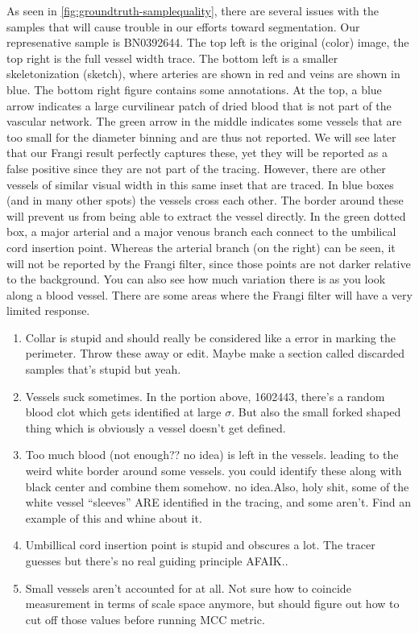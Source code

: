 As seen in \cref{fig:groundtruth-samplequality}, there are several issues with the samples that will cause trouble in our efforts toward segmentation. Our represenative sample is BN0392644. The top left is the original (color) image, the top right is the full vessel width trace. The bottom left is a smaller skeletonization (sketch), where arteries are shown in red and veins are shown in blue. The bottom right figure contains some annotations. At the top, a blue arrow indicates a large curvilinear patch of dried blood that is not part of the vascular network. The green arrow in the middle indicates some vessels that are too small for the diameter binning and are thus not reported. We will see later that our Frangi result perfectly captures these, yet they will be reported as a false positive since they are not part of the tracing. However, there are other vessels of similar visual width in this same inset that are traced. In blue boxes (and in many other spots) the vessels cross each other. The border around these will prevent us from being able to extract the vessel directly. In the green dotted box, a major arterial and a major venous branch each connect to the umbilical cord insertion point. Whereas the arterial branch (on the right) can be seen, it will not be reported by the Frangi filter, since those points are not darker relative to the background. You can also see how much variation there is as you look along a blood vessel. There are some areas where the Frangi filter will have a very limited response. 



\begin{enumerate}
\item Collar is stupid and should really be considered like a error in marking the perimeter. Throw these away or edit. Maybe make a section called discarded samples that's stupid but yeah.
\item Vessels suck sometimes. In the portion above, 1602443, there's a random blood clot which gets identified at large $\sigma$. But also the small forked shaped thing which is obviously a vessel doesn't get defined.
\item Too much blood (not enough?? no idea) is left in the vessels. leading to the weird white border around some vessels. you could identify these along with black center and combine them somehow. no idea.Also, holy shit, some of the white vessel ``sleeves'' ARE identified in the tracing, and some aren't. Find an example of this and whine about it.
\item Umbillical cord insertion point is stupid and obscures a lot. The tracer guesses but there's no real guiding principle AFAIK..
\item Small vessels aren't accounted for at all. Not sure how to coincide measurement in terms of scale space anymore, but should figure out how to cut off those values before running MCC metric.
\end{enumerate}





